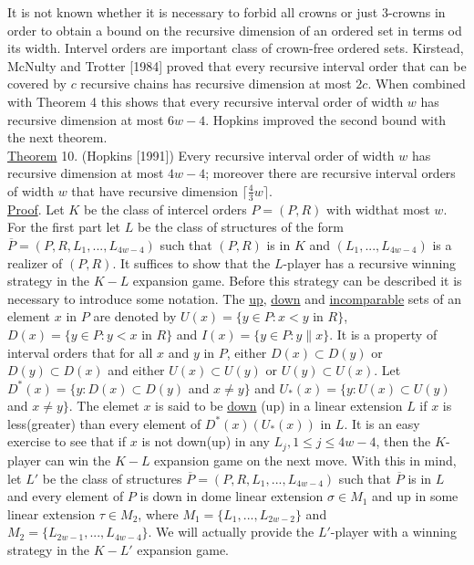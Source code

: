 \documentclass[twoside]{article}
\begin{document}
It is not known whether it is necessary to forbid all crowns or just 3-crowns in order to obtain a bound
on the recursive dimension of an ordered set in terms od its width. Intervel orders are important class of
crown-free ordered sets. Kirstead, McNulty and Trotter [1984] proved that every recursive interval order
that can be covered by $c$ recursive chains has recursive dimension at most $2c$. When combined with
Theorem 4 this shows that every recursive interval order of width $w$ has recursive dimension at most 
$6w-4$. Hopkins improved the second bound with the next theorem.\\
%
%
\newline
\underline{Theorem} 10. (Hopkins [1991]) Every recursive interval order of width $w$ has recursive dimension
at most $4w-4$; moreover there are recursive interval orders of width $w$ that have recursive dimension
$\lceil {\frac 4 3}w \rceil$.\\
\newline
\underline{Proof}. Let $K$ be the class of intercel orders $P =(P,R)$ with widthat most $w$.
For the first part let $L$ be the class of structures of the form $\overline{P}=(P,R,L_1,...,L_{4w-4})$
such that $(P,R)$ is in $K$ and $(L_1,...,L_{4w-4})$ is a realizer of $(P,R)$. It suffices to show that the $L$-player has a recursive winning
strategy in the $K-L$ expansion game. Before this strategy can be described it is necessary
to introduce some notation. The \underline{up}, \underline{down} and \underline{incomparable}
sets of an element $x$ in $P$ are denoted by $U(x) =\{y\in P: x<y$ in $R\}$,
$D(x)=\{y \in P:y<x$ in $R\}$ and $I(x) =\{y\in P: y\parallel x\}$. It is a property of interval
orders that for all $x$ and $y$ in $P$, either $D(x) \subset D(y)$ or $D(y) \subset D(x)$
and either $U(x) \subset U(y)$ or $U(y) \subset U(x)$. Let 
$D^*(x) = \{y: D(x) \subset D(y)$ and $ x\neq y\}$ and $U_*(x) =\{ y: U(x) \subset U(y)$ and $x \neq y\}$.
The elemet $x$ is said to be \underline{down} (up) in  a linear extension $L$ if $x$ is less(greater)
than every element of $D^*(x) (U_*(x))$ in $L$. It is an easy exercise to see that if $x$ is not down(up)
in any $L_j, 1\leq j\leq 4w-4$, then the $K$-player can win the $K-L$ expansion game on the next move.
With this in mind, let $L'$ be the class of structures $\overline{P}=(P,R,L_1,...,L_{4w-4})$ such that
$\overline{P}$ is in $L$ and every element of $P$ is down in dome linear extension $\sigma \in M_1$
and up in some linear extension $\tau \in M_2$, where $M_1 = \{L_1,...,L_{2w-2}\}$ and
$M_2 = \{L_{2w-1},...,L_{4w-4}\}$. We will actually provide the $L'$-player with a winning strategy in
the $K-L'$ expansion game.
\end{document}
